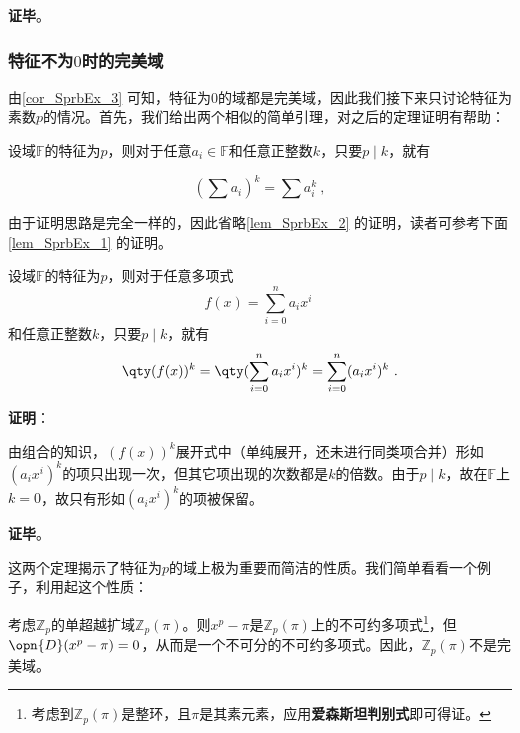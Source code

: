 \textbf{证毕}。









\subsubsection{特征不为$0$时的完美域}


由\autoref{cor_SprbEx_3} 可知，特征为$0$的域都是完美域，因此我们接下来只讨论特征为素数$p$的情况。首先，我们给出两个相似的简单引理，对之后的定理证明有帮助：


\begin{lemma}{}\label{lem_SprbEx_2}
设域$\mathbb{F}$的特征为$p$，则对于任意$a_i\in\mathbb{F}$和任意正整数$k$，只要$p\mid k$，就有

\begin{equation}
(\sum a_i)^k = \sum a_i^k~,
\end{equation}

\end{lemma}

由于证明思路是完全一样的，因此省略\autoref{lem_SprbEx_2} 的证明，读者可参考下面\autoref{lem_SprbEx_1} 的证明。


\begin{lemma}{}\label{lem_SprbEx_1}
设域$\mathbb{F}$的特征为$p$，则对于任意多项式
\begin{equation}
f(x) = \sum_{i=0}^n a_ix^i~
\end{equation}
和任意正整数$k$，只要$p\mid k$，就有
\begin{equation}
\qty(f(x))^k = \qty(\sum_{i=0}^n a_ix^i)^k = \sum_{i=0}^n (a_ix^i)^k~.
\end{equation}
\end{lemma}

\textbf{证明}：

由组合的知识，$(f(x))^k$展开式中（单纯展开，还未进行同类项合并）形如$(a_ix^i)^k$的项只出现一次，但其它项出现的次数都是$k$的倍数。由于$p\mid k$，故在$\mathbb{F}$上$k=0$，故只有形如$(a_ix^i)^k$的项被保留。

\textbf{证毕}。


这两个定理揭示了特征为$p$的域上极为重要而简洁的性质。我们简单看看一个例子，利用起这个性质：




\begin{example}{}\label{ex_SprbEx_2}
考虑$\mathbb{Z}_p$的单超越扩域$\mathbb{Z}_p(\pi)$。则$x^p-\pi$是$\mathbb{Z}_p(\pi)$上的不可约多项式\footnote{考虑到$\mathbb{Z}_p(\pi)$是整环，且$\pi$是其素元素，应用\textbf{爱森斯坦判别式}即可得证。}，但$\opn{D}(x^p-\pi)=0$，从而是一个不可分的不可约多项式。因此，$\mathbb{Z}_p(\pi)$不是完美域。

\end{example}




